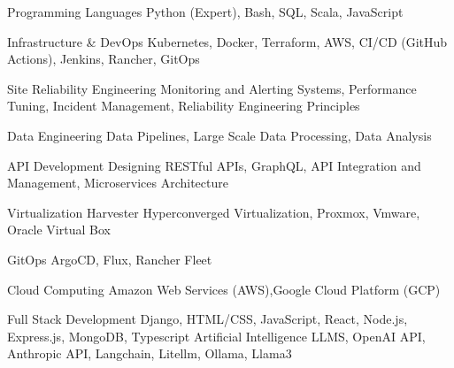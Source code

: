 


\begin{cvskills}


\cvskill
{Programming Languages} %
{Python (Expert), Bash, SQL, Scala, JavaScript} %


\cvskill
{Infrastructure \& DevOps} %
{Kubernetes, Docker, Terraform, AWS, CI/CD (GitHub Actions), Jenkins, Rancher, GitOps} %


\cvskill
{Site Reliability Engineering} %
{Monitoring and Alerting Systems, Performance Tuning, Incident Management, Reliability Engineering Principles} %


\cvskill
{Data Engineering} %
{Data Pipelines, Large Scale Data Processing, Data Analysis} %


\cvskill
{API Development} %
{Designing RESTful APIs, GraphQL, API Integration and Management, Microservices Architecture} %


\cvskill
{Virtualization} %
{Harvester Hyperconverged Virtualization, Proxmox, Vmware, Oracle Virtual Box} %


\cvskill
{GitOps} %
{ArgoCD, Flux, Rancher Fleet} %

\cvskill
{Cloud Computing}
{Amazon Web Services (AWS),Google Cloud Platform (GCP)}

\cvskill
{Full Stack Development}
{Django, HTML/CSS, JavaScript, React, Node.js, Express.js, MongoDB, Typescript}
\cvskill
{Artificial Intelligence}
{LLMS, OpenAI API, Anthropic API, Langchain, Litellm, Ollama, Llama3}


\end{cvskills}
